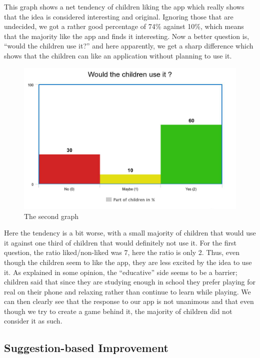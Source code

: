 \documentclass[12pt]{scrartcl}
\begin{document}
			This graph shows a net tendency of children liking the app which really shows that the idea is considered interesting and original. Ignoring those that are undecided, we got a rather good percentage of 74\% against 10\%, which means that the majority like the app and finds it interesting. Now a better question is, “would the children use it?” and here apparently, we get a sharp difference which shows that the children can like an application without planning to use it.\\

			\begin{figure}[H]
                        		\centering
               			\includegraphics[width=\textwidth]{../images/image_3_data_analysis.jpeg}
               			\caption{The second graph}
                        		\label{analysis3}
      			\end{figure}

			Here the tendency is a bit worse, with a small majority of children that would use it against one third of children that would definitely not use it. For the first question, the ratio liked/non-liked was 7, here the ratio is only 2. Thus, even though the children seem to like the app, they are less excited by the idea to use it. As explained in some opinion, the ``educative'' side seems to be a barrier; children said that since they are studying enough in school they prefer playing for real on their phone and relaxing rather than continue to learn while playing. We can then clearly see that the response to our app is not unanimous and that even though we try to create a game behind it, the majority of children did not consider it as such.

		
	\subsection{Suggestion-based Improvement}
	
\end{document}
